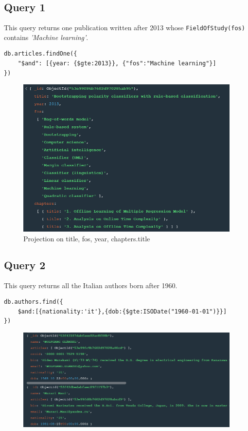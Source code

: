 \documentclass{Configuration_Files/PoliMi3i_thesis}
\begin{document}
\subsection{Query 1}
This query returns one publication written after 2013 whose \verb |FieldOfStudy(fos)| contains \emph{'Machine learning'}.
\begin{lstlisting}
db.articles.findOne({
	"$and": [{year: {$gte:2013}}, {"fos":"Machine learning"}]
})
\end{lstlisting}
\begin{figure}[H]
\centering
\includegraphics[width=1\textwidth]{query/mongo_q1.PNG}
\caption{Projection on title, fos, year, chapters.title}
\label{fig:query1}
\end{figure}

\newpage
\subsection{Query 2}
This query returns all the Italian authors born after 1960.
\begin{lstlisting}
db.authors.find({
	$and:[{nationality:'it'},{dob:{$gte:ISODate("1960-01-01")}}]
})
\end{lstlisting}
\begin{figure}[H]
\centering
\includegraphics[width=1\textwidth]{query/mongo_q2.PNG}
\label{fig:query2}
\end{figure}
\end{document}
